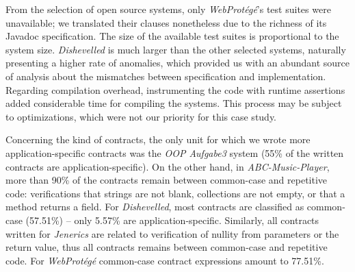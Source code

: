 


From the selection of open source systems, only \emph{WebProtégé}'s test suites were unavailable; we translated their clauses nonetheless due to the richness of its Javadoc specification.
The size of the available test suites is proportional to the system size.
\emph{Dishevelled} is much larger than the other selected systems, naturally presenting a higher rate of anomalies, which provided us with an abundant source of analysis about the mismatches between specification and implementation. 
Regarding compilation overhead, instrumenting the code with runtime assertions added considerable time for compiling the systems. This process may be subject to optimizations, which were not our priority for this case study.

Concerning the kind of contracts, the only unit for which we wrote more application-specific contracts was the \emph{OOP Aufgabe3} system (55\% of the written contracts are application-specific). On the other hand, in \emph{ABC-Music-Player}, more than 90\% of the contracts remain between common-case and repetitive code: verifications that strings are not blank, collections are not empty, or that a method returns a field.
For \emph{Dishevelled}, most contracts are classified as common-case (57.51\%) -- 
only 5.57\% are application-specific.
Similarly, all contracts written for \emph{Jenerics} are related to verification of nullity from parameters or the return value, thus all contracts
remains between common-case and repetitive code.
For \emph{WebProt\'{e}g\'{e}}  common-case contract expressions amount to 77.51\%.  


